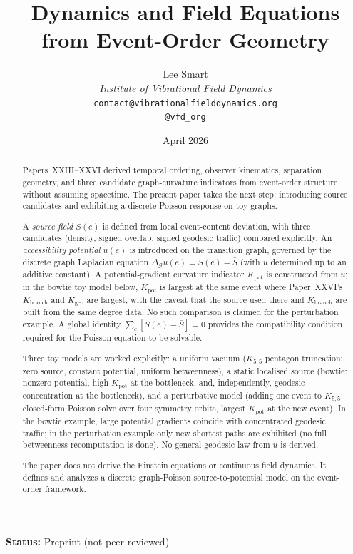 \documentclass[12pt]{article}
\title{Dynamics and Field Equations\\from Event-Order Geometry}
\author{%
  Lee Smart\\[4pt]
  \textit{Institute of Vibrational Field Dynamics}\\[2pt]
  \texttt{contact@vibrationalfielddynamics.org}\\[2pt]
  \texttt{@vfd\_org}%
}
\date{April 2026}
\newcommand{\Gcal}{\mathcal{G}}
\begin{document}
\maketitle

\noindent\textbf{Status:} Preprint (not peer-reviewed)

\begin{abstract}
Papers~XXIII--XXVI derived temporal ordering, observer kinematics, separation geometry, and three candidate graph-curvature indicators from event-order structure without assuming spacetime. The present paper takes the next step: introducing source candidates and exhibiting a discrete Poisson response on toy graphs.

A \textit{source field} $S(e)$ is defined from local event-content deviation, with three candidates (density, signed overlap, signed geodesic traffic) compared explicitly. An \textit{accessibility potential} $u(e)$ is introduced on the transition graph, governed by the discrete graph Laplacian equation $\Delta_\Gcal u(e) = S(e) - \bar{S}$ (with $u$ determined up to an additive constant). A potential-gradient curvature indicator $K_{\mathrm{pot}}$ is constructed from $u$; in the bowtie toy model below, $K_{\mathrm{pot}}$ is largest at the same event where Paper~XXVI's $K_{\mathrm{branch}}$ and $K_{\mathrm{geo}}$ are largest, with the caveat that the source used there and $K_{\mathrm{branch}}$ are built from the same degree data. No such comparison is claimed for the perturbation example. A global identity $\sum_e [S(e) - \bar{S}] = 0$ provides the compatibility condition required for the Poisson equation to be solvable.

Three toy models are worked explicitly: a uniform vacuum ($K_{5,5}$ pentagon truncation: zero source, constant potential, uniform betweenness), a static localised source (bowtie: nonzero potential, high $K_{\mathrm{pot}}$ at the bottleneck, and, independently, geodesic concentration at the bottleneck), and a perturbative model (adding one event to $K_{5,5}$: closed-form Poisson solve over four symmetry orbits, largest $K_{\mathrm{pot}}$ at the new event). In the bowtie example, large potential gradients coincide with concentrated geodesic traffic; in the perturbation example only new shortest paths are exhibited (no full betweenness recomputation is done). No general geodesic law from $u$ is derived.

The paper does not derive the Einstein equations or continuous field dynamics. It defines and analyzes a discrete graph-Poisson source-to-potential model on the event-order framework.
\end{abstract}
\end{document}
